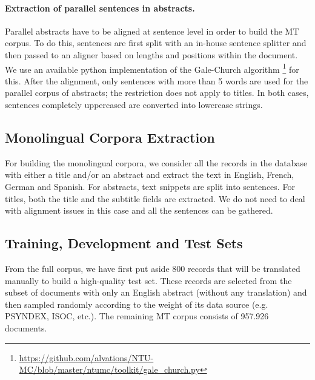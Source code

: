 \documentclass[a4paper,11pt]{article}
\begin{document}
\paragraph{Extraction of parallel sentences in abstracts.}

Parallel abstracts have to be aligned at sentence level in order to build the MT corpus. To do this, sentences are first split with an in-house sentence splitter and then passed to an aligner based on lengths and positions within the document. We use an available python implementation of the Gale-Church algorithm%
\footnote{\url{https://github.com/alvations/NTU-MC/blob/master/ntumc/toolkit/gale_church.py}} \cite{galeChurch:1993} for this. After the alignment, only sentences with more than 5 words are used for the parallel corpus of abstracts; the restriction does not apply to titles. In both cases, sentences completely uppercased are converted into lowercase strings.



\subsection{Monolingual Corpora Extraction}
\label{ss:pubMono}

For building the monolingual corpora, we consider all the records in the database with either a title and/or an abstract and extract the text in English, French, German and Spanish. For abstracts, text snippets are split into sentences. For titles, both the title and the subtitle fields are extracted. We do not need to deal with alignment issues in this case and all the sentences can be gathered.



\subsection{Training, Development and Test Sets}
\label{ss:pubSets}


From the full corpus, we have first put aside 800 records that will be translated manually to build a high-quality test set. These records are selected from the subset of documents with only an English abstract (without any translation) and then sampled randomly according to the weight of its data source (e.g. PSYNDEX, ISOC, etc.). The remaining MT corpus consists of 957.926 documents.
\end{document}
